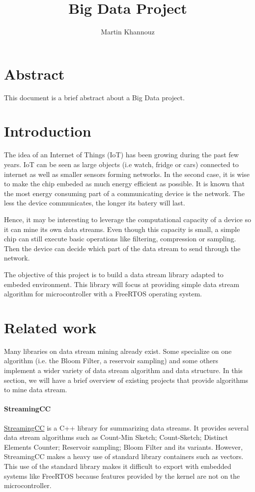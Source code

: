 \documentclass{article}
\title{Big Data Project}
\author{Martin Khannouz}
\begin{document}
\maketitle

\section*{Abstract}
This document is a brief abstract about a Big Data project.
\section{Introduction}
The idea of an Internet of Things (IoT) has been growing during the past few years.
IoT can be seen as large objects (i.e watch, fridge or cars) connected to internet as
well as smaller sensors forming networks.
In the second case, it is wise to make the chip embeded as much energy efficient as
possible. It is known that the most energy consuming part of a communicating device
is the network. The less the device communicates, the longer its batery will last.

Hence, it may be interesting to leverage the computational capacity of a device
so it can mine its own data streams. Even though this capacity is small, a simple
chip can still execute basic operations like filtering, compression or sampling.
Then the device can decide which part of the data stream to send through the
network.

The objective of this project is to build a data stream library adapted to embeded
environment. This library will focus at providing simple data stream algorithm
for microcontroller with a FreeRTOS operating system.

\section{Related work}
Many libraries on data stream mining already exist. Some specialize on one
algorithm (i.e. the Bloom Filter, a reservoir sampling) and some others implement
a wider variety of data stream algorithm and data structure. In this section, we will have a brief
overview of existing projects that provide algorithms to mine data stream.

\paragraph{StreamingCC}
	\href{https://github.com/jiecchen/StreamingCC}{StreamingCC} is a C++ library for summarizing data streams.
	It provides several data stream algorithms such as Count-Min Sketch;
	Count-Sketch; Distinct Elements Counter; Reservoir sampling; Bloom Filter and its variants.
	However, StreamingCC makes a heavy use of standard library containers such as vectors.
	This use of the standard library makes it difficult to export with embedded systems like
	FreeRTOS because features provided by the kernel are not on the microcontroller.
\end{document}
